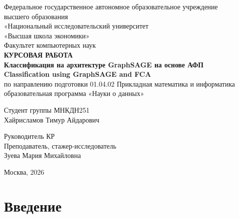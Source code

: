 \documentclass[14pt,a4paper]{extarticle}
\begin{document}
\justifying

\thispagestyle{empty}
\begin{center}
Федеральное государственное автономное образовательное учреждение\\
высшего образования\\
«Национальный исследовательский университет\\
«Высшая школа экономики»\\[1em]

Факультет компьютерных наук\\[4em]

{\bfseries КУРСОВАЯ РАБОТА}\\[2em]

{\bfseries Классификация на архитектуре GraphSAGE на основе АФП}\\[0.5em]
{\bfseries Classification using GraphSAGE and FCA}\\[3em]

по направлению подготовки 01.04.02 Прикладная математика и информатика\\
образовательная программа «Науки о данных»
\end{center}

\vspace{5em}

\noindent\hfill
\begin{minipage}{8.5cm}
\normalfont\normalsize
\setlength{\parindent}{0pt}
\raggedright

Студент группы МНКДН251\\
Хайрисламов Тимур Айдарович

\vspace{1.8em}

Руководитель КР\\
Преподаватель, стажер-исследователь\\
Зуева Мария Михайловна

\end{minipage}

\vfill

\begin{center}
Москва, 2026
\end{center}

\clearpage

\setcounter{page}{2}
\renewcommand{\contentsname}{Содержание}
\tableofcontents
\clearpage

\section*{Введение}
\end{document}
